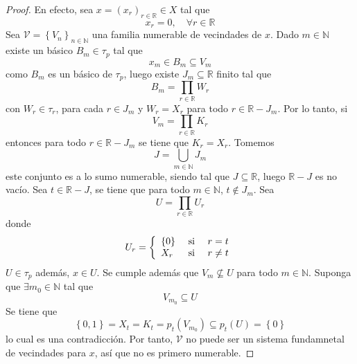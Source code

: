 \documentclass[12pt]{report}
\theoremstyle{largebreak}
\begin{document}
    \begin{proof}
        En efecto, sea $x=\left(x_r\right)_{ r\in\mathbb{R}}\in X$ tal que
        \begin{equation*}
            x_r=0,\quad\forall r\in\mathbb{R}
        \end{equation*}
        Sea $\mathcal{V}=\left\{V_n \right\}_{ n\in\mathbb{N}}$ una familia numerable de vecindades de $x$. Dado $m\in\mathbb{N}$ existe un básico $B_m\in\tau_p$ tal que
        \begin{equation*}
            x_m\in B_m\subseteq V_m
        \end{equation*}
        como $B_m$ es un básico de $\tau_p$, luego existe $J_m\subseteq\mathbb{R}$ finito tal que
        \begin{equation*}
            B_m=\prod_{ r\in\mathbb{R}}W_r
        \end{equation*}
        con $W_r\in\tau_r$, para cada $r\in J_m$ y $W_r=X_r$ para todo $r\in\mathbb{R}-J_m$. Por lo tanto, si
        \begin{equation*}
            V_m=\prod_{ r\in\mathbb{R}}K_r
        \end{equation*}
        entonces para todo $r\in\mathbb{R}-J_m$ se tiene que $K_r=X_r$. Tomemos
        \begin{equation*}
            J=\bigcup_{ m\in\mathbb{N}}J_m
        \end{equation*}
        este conjunto es a lo sumo numerable, siendo tal que $J\subseteq\mathbb{R}$, luego $\mathbb{R}-J$ es no vacío. Sea $t\in\mathbb{R}-J$, se tiene que para todo $m\in\mathbb{N}$, $t\notin J_m$. Sea
        \begin{equation*}
            U=\prod_{ r\in\mathbb{R}}U_r
        \end{equation*}
        donde
        \begin{equation*}
            U_r=\left\{ 
                \begin{array}{lcr}
                    \left\{0\right\} & \textup{ si } & r=t\\
                    X_r & \textup{ si } & r\neq t\\ 
                \end{array}
            \right.
        \end{equation*}
        $U\in\tau_p$ además, $x\in U$. Se cumple además que $V_m\nsubseteq U$ para todo $m\in\mathbb{N}$. Suponga que $\exists m_0\in\mathbb{N}$ tal que
        \begin{equation*}
            V_{ m_0}\subseteq U
        \end{equation*}
        Se tiene que
        \begin{equation*}
            \left\{0,1\right\}=X_t=K_t=p_t(V_{ m_0})\subseteq p_t(U)=\left\{0\right\}
        \end{equation*}
        lo cual es una contradicción. Por tanto, $\mathcal{V}$ no puede ser un sistema fundamnetal de vecindades para $x$, así que no es primero numerable.
    \end{proof}
\end{document}
